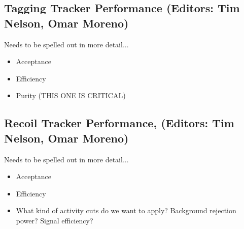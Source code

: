 
\subsection{Tagging Tracker Performance (Editors: Tim Nelson, Omar Moreno)}

Needs to be spelled out in more detail...
\begin{itemize}
    \item Acceptance
    \item Efficiency 
    \item Purity (THIS ONE IS CRITICAL)
\end{itemize}

\subsection{Recoil Tracker Performance, (Editors: Tim Nelson, Omar Moreno)}

Needs to be spelled out in more detail...
\begin{itemize}
    \item Acceptance
    \item Efficiency 
    \item What kind of activity cuts do we want to apply?  Background rejection
          power?  Signal efficiency? 
\end{itemize}




